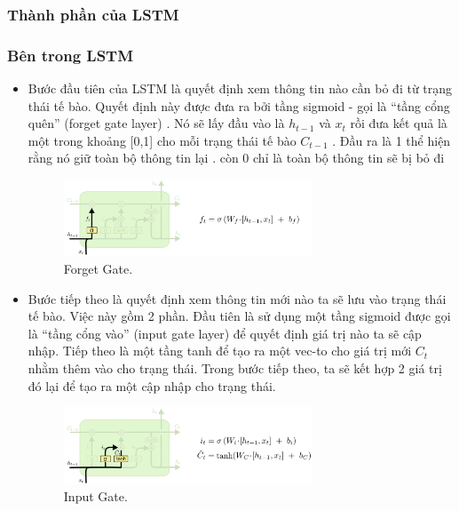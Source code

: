 \subsubsection{Thành phần của LSTM}


\subsubsection{Bên trong LSTM}

\begin{itemize}
    \item Bước đầu tiên của LSTM là quyết định xem thông tin nào cần bỏ đi từ trạng thái tế bào. Quyết định này được đưa ra bởi tầng sigmoid - gọi là “tầng cổng quên” (forget gate layer) . Nó sẽ lấy đầu vào là  \( h_{t-1} \) và \( x_{t} \) rồi đưa kết quả là một trong khoảng [0,1] cho mỗi trạng thái tế bào \( C_{t-1} \) . Đầu ra là 1 thể hiện rằng nó giữ toàn bộ thông tin lại . còn 0 chỉ là toàn bộ thông tin sẽ bị bỏ đi 
    \begin{figure}[h!]
	\centering
	\includegraphics[width=0.7\textwidth]{Figures/LSTM3-focus-f.png}
	\caption[Forget Gate.]{Forget Gate.}
	\label{LSTM3-focus-f.png} 
\end{figure}
    \item Bước tiếp theo là quyết định xem thông tin mới nào ta sẽ lưu vào trạng thái tế bào. Việc này gồm 2 phần. Đầu tiên là sử dụng một tầng sigmoid được gọi là “tầng cổng vào” (input gate layer) để quyết định giá trị nào ta sẽ cập nhập. Tiếp theo là một tầng tanh để tạo ra một vec-to cho giá trị mới \( C_{t} \) nhằm thêm vào cho trạng thái. Trong bước tiếp theo, ta sẽ kết hợp 2 giá trị đó lại để tạo ra một cập nhập cho trạng thái.
    \begin{figure}[h!]
	\centering
	\includegraphics[width=0.7\textwidth]{Figures/LSTM3-focus-i.png}
	\caption[Input Gate.]{Input Gate.}
	\label{LSTM3-focus-i.png} 
\end{figure}

\end{itemize}
